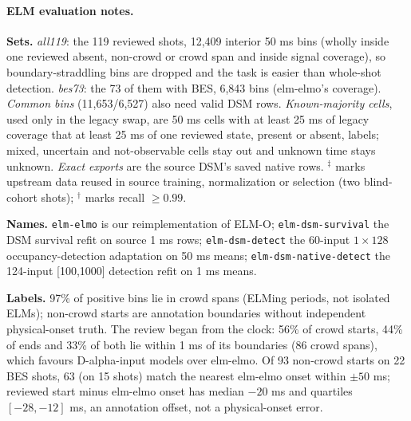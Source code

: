 \paragraph{ELM evaluation notes.}\label{app:elm-table-notes}

\textbf{Sets.} \emph{all119}: the 119 reviewed shots, 12,409 interior 50 ms bins (wholly inside one reviewed absent, non-crowd or crowd span and inside signal coverage), so boundary-straddling bins are dropped and the task is easier than whole-shot detection. \emph{bes73}: the 73 of them with BES, 6,843 bins (elm-elmo's coverage). \emph{Common bins} (11,653/6,527) also need valid DSM rows. \emph{Known-majority cells}, used only in the legacy swap, are 50 ms cells with at least 25 ms of legacy coverage that at least 25 ms of one reviewed state, present or absent, labels; mixed, uncertain and not-observable cells stay out and unknown time stays unknown. \emph{Exact exports} are the source DSM's saved native rows. $^{\ddagger}$ marks upstream data reused in source training, normalization or selection (two blind-cohort shots); $^{\dagger}$ marks recall $\geq0.99$.

\textbf{Names.} \texttt{elm-elmo} is our reimplementation of ELM-O; \texttt{elm-dsm-survival} the DSM survival refit on source 1 ms rows; \texttt{elm-dsm-detect} the 60-input $1\times128$ occupancy-detection adaptation on 50 ms means; \texttt{elm-dsm-native-detect} the 124-input [100,1000] detection refit on 1 ms means.

\textbf{Labels.} 97\% of positive bins lie in crowd spans (ELMing periods, not isolated ELMs); non-crowd starts are annotation boundaries without independent physical-onset truth. The review began from the clock: 56\% of crowd starts, 44\% of ends and 33\% of both lie within 1 ms of its boundaries (86 crowd spans), which favours D-alpha-input models over elm-elmo. Of 93 non-crowd starts on 22 BES shots, 63 (on 15 shots) match the nearest elm-elmo onset within $\pm50$ ms; reviewed start minus elm-elmo onset has median $-20$ ms and quartiles $[-28, -12]$ ms, an annotation offset, not a physical-onset error.


